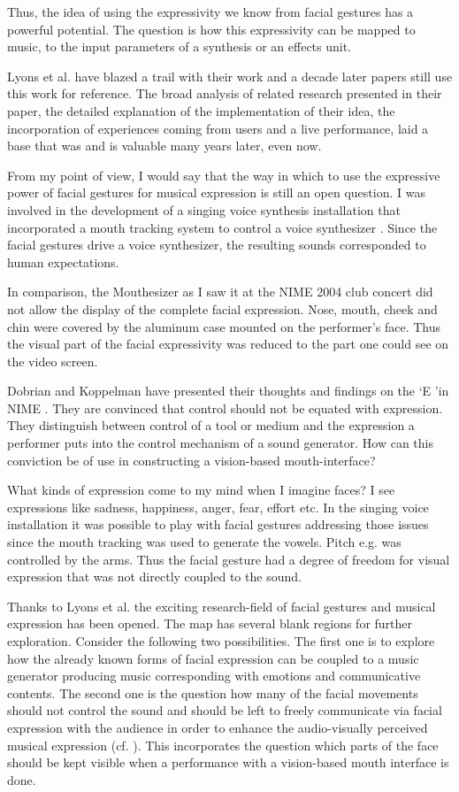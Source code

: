 Thus, the idea of using the expressivity we know from facial gestures has a powerful potential. The question is how this expressivity can be mapped to music, to the input parameters of a synthesis or an effects unit. 

Lyons et al. \cite{Lyons:2003} have blazed a trail with their work and a decade later papers still use this work for reference. The broad analysis of related research presented in their paper, the detailed explanation of the implementation of their idea, the incorporation of experiences coming from users and a live performance, laid a base that was and is valuable many years later, even now. 

From my point of view, I would say that the way in which to use the expressive power of facial gestures for musical expression is still an open question.  I was involved in the development of a singing voice synthesis installation that incorporated a mouth tracking system to control a voice synthesizer \cite{Poepel:2014}. Since the facial gestures drive a voice synthesizer, the resulting sounds corresponded to human expectations.

In comparison, the Mouthesizer as I saw it at the NIME 2004 club concert did not allow the display of the complete facial expression. Nose, mouth, cheek and chin were covered by the aluminum case mounted on the performer's face. Thus the visual part of the facial expressivity was reduced to the part one could see on the video screen. 

Dobrian and Koppelman have presented their thoughts and findings on the \lq E \rq in NIME \cite{Dobrian:2006}. They are convinced that control should not be equated with expression. They distinguish between control of a tool or medium and the expression a performer puts into the control mechanism of a sound generator. How can this conviction be of use in constructing a vision-based mouth-interface?

What kinds of expression come to my mind when I imagine faces? I see expressions like  sadness, happiness, anger, fear, effort etc. In the singing voice installation \cite{Poepel:2014} it was possible to play with facial gestures addressing those issues since the mouth tracking was used to generate the vowels. Pitch e.g. was controlled by the arms. Thus the facial gesture had a degree of freedom for visual expression that was not directly coupled to the sound. 

Thanks to Lyons et al. the exciting research-field of facial gestures and musical expression has been opened. The map has several blank regions for further exploration. Consider the following two possibilities. The first one is to explore how the already known forms of facial expression can be coupled to a music generator producing music corresponding with emotions and communicative contents. The second one is the question how many of the facial movements should not control the sound and should be left to freely communicate via facial expression with the audience in order to enhance the audio-visually perceived musical expression (cf. \cite{Behne:2011}). This incorporates the question which parts of the face should be kept visible when a performance with a vision-based mouth interface is done.
